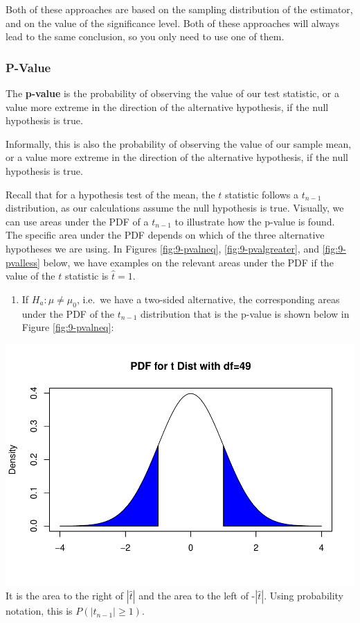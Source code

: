 \documentclass[
]{book}
\providecommand{\tightlist}{%
  \setlength{\itemsep}{0pt}\setlength{\parskip}{0pt}}
\begin{document}
Both of these approaches are based on the sampling distribution of the estimator, and on the value of the significance level. Both of these approaches will always lead to the same conclusion, so you only need to use one of them.

\subsubsection{P-Value}\label{p-value}

The \textbf{p-value} is the probability of observing the value of our test statistic, or a value more extreme in the direction of the alternative hypothesis, if the null hypothesis is true.

Informally, this is also the probability of observing the value of our sample mean, or a value more extreme in the direction of the alternative hypothesis, if the null hypothesis is true.

Recall that for a hypothesis test of the mean, the \(t\) statistic follows a \(t_{n-1}\) distribution, as our calculations assume the null hypothesis is true. Visually, we can use areas under the PDF of a \(t_{n-1}\) to illustrate how the p-value is found. The specific area under the PDF depends on which of the three alternative hypotheses we are using. In Figures \ref{fig:9-pvalneq}, \ref{fig:9-pvalgreater}, and \ref{fig:9-pvalless} below, we have examples on the relevant areas under the PDF if the value of the \(t\) statistic is \(\hat{t} = 1\).

\begin{enumerate}
\def\labelenumi{\arabic{enumi}.}
\tightlist
\item
  If \(H_a: \mu  \neq \mu_0\), i.e.~we have a two-sided alternative, the corresponding areas under the PDF of the \(t_{n-1}\) distribution that is the p-value is shown below in Figure \ref{fig:9-pvalneq}:
\end{enumerate}

\includegraphics{bookdown-demo_files/figure-latex/9-pvalneq-1.pdf}
It is the area to the right of \(|\hat{t}|\) and the area to the left of -\(|\hat{t}|\). Using probability notation, this is \(P(|t_{n-1}| \geq 1)\).
\end{document}

